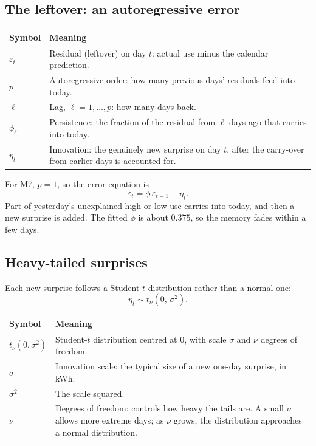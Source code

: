 \documentclass[11pt]{article}
\makeatletter
\newenvironment{reftable}[3]
  {\par\nopagebreak\addvspace{4pt}\noindent
   \renewcommand{\arraystretch}{1.3}%
   \begin{tabular}{@{}>{\raggedright\arraybackslash}p{#1\textwidth}
                      >{\raggedright\arraybackslash}p{\dimexpr0.97\textwidth-#1\textwidth-2\tabcolsep\relax}@{}}
   \toprule \textbf{#2} & \textbf{#3} \\ \midrule}
  {\bottomrule\end{tabular}\par\addvspace{8pt}}
\makeatother
\begin{document}
\subsection{The leftover: an autoregressive error}

\begin{reftable}{0.2}{Symbol}{Meaning}
$\varepsilon_t$ & Residual (leftover) on day $t$: actual use minus the calendar prediction. \\
$p$ & Autoregressive order: how many previous days' residuals feed into today. \\
$\ell$ & Lag, $\ell = 1, \ldots, p$: how many days back. \\
$\phi_\ell$ & Persistence: the fraction of the residual from $\ell$ days ago that carries into today. \\
$\eta_t$ & Innovation: the genuinely new surprise on day $t$, after the carry-over from earlier days is accounted for. \\
\end{reftable}

For M7, $p = 1$, so the error equation is
\begin{equation}
\varepsilon_t = \phi\,\varepsilon_{t-1} + \eta_t .
\label{eq:ar1}
\end{equation}
Part of yesterday's unexplained high or low use carries into today, and then a
new surprise is added. The fitted $\phi$ is about $0.375$, so the memory fades
within a few days.

\subsection{Heavy-tailed surprises}

Each new surprise follows a Student-$t$ distribution rather than a normal one:
\begin{equation}
\eta_t \sim t_\nu(0,\, \sigma^2).
\label{eq:t}
\end{equation}

\begin{reftable}{0.2}{Symbol}{Meaning}
$t_\nu(0,\sigma^2)$ & Student-$t$ distribution centred at 0, with scale $\sigma$ and $\nu$ degrees of freedom. \\
$\sigma$ & Innovation scale: the typical size of a new one-day surprise, in kWh. \\
$\sigma^2$ & The scale squared. \\
$\nu$ & Degrees of freedom: controls how heavy the tails are. A small $\nu$ allows more extreme days; as $\nu$ grows, the distribution approaches a normal distribution. \\
\end{reftable}
\end{document}
